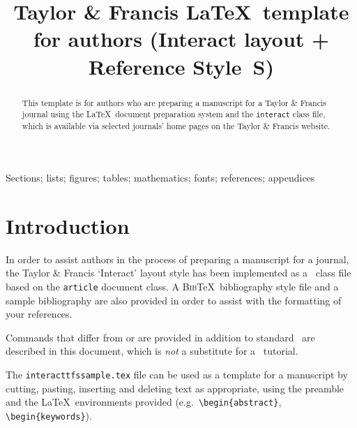 \documentclass[]{interact}
\theoremstyle{plain}%
\theoremstyle{definition}
\theoremstyle{remark}
\begin{document}

\title{Taylor \& Francis \LaTeX\ template for authors (\textsf{Interact} layout + Reference Style~S)}

\author{
}

\maketitle

\begin{abstract}
This template is for authors who are preparing a manuscript for a Taylor \& Francis journal using the \LaTeX\ document preparation system and the \texttt{interact} class file, which is available via selected journals' home pages on the Taylor \& Francis website.
\end{abstract}

\begin{keywords}
Sections; lists; figures; tables; mathematics; fonts; references; appendices
\end{keywords}


\section{Introduction}

In order to assist authors in the process of preparing a manuscript for a journal, the Taylor \& Francis `\textsf{Interact}' layout style has been implemented as a \LaTeXe\ class file based on the \texttt{article} document class. A \textsc{Bib}\TeX\ bibliography style file and a sample bibliography are also provided in order to assist with the formatting of your references.

Commands that differ from or are provided in addition to standard \LaTeXe\ are described in this document, which is \emph{not} a substitute for a \LaTeXe\ tutorial.

The \texttt{interacttfssample.tex} file can be used as a template for a manuscript by cutting, pasting, inserting and deleting text as appropriate, using the preamble and the \LaTeX\ environments provided (e.g.\ \verb"\begin{abstract}", \verb"\begin{keywords}").
\end{document}

